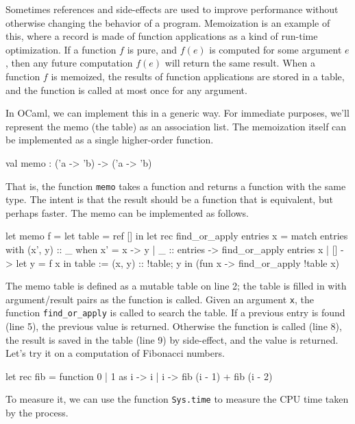 
Sometimes references and side-effects are used to improve performance without otherwise changing the
behavior of a program.  Memoization is an example of this, where a record is made of function
applications as a kind of run-time optimization.  If a function $f$ is pure, and $f(e)$ is computed
for some argument $e$, then any future computation $f(e)$ will return the same result.  When a
function $f$ is memoized, the results of function applications are stored in a table, and the
function is called at most once for any argument.

In OCaml, we can implement this in a generic way.  For immediate purposes, we'll represent the memo
(the table) as an association list.  The memoization itself can be implemented as a single higher-order function.

\begin{ocaml}
val memo : ('a -> 'b) -> ('a -> 'b)
\end{ocaml}
%
That is, the function \hbox{\lstinline/memo/} takes a function and returns a function with the same type.
The intent is that the result should be a function that is equivalent, but perhaps faster.  The memo
can be implemented as follows.

\begin{ocamlnum}
let memo f =
   let table = ref [] in
   let rec find_or_apply entries x =
      match entries with
         (x', y) :: _ when x' = x -> y
       | _ :: entries -> find_or_apply entries x
       | [] ->
          let y = f x in
          table := (x, y) :: !table;
          y
   in
   (fun x -> find_or_apply !table x)
\end{ocamlnum}
%
The memo table is defined as a mutable table on line 2; the table is filled in with argument/result
pairs as the function is called.  Given an argument \hbox{\lstinline/x/}, the
function \hbox{\lstinline/find_or_apply/} is called to search the table.  If a previous entry is found
(line 5), the previous value is returned.  Otherwise the function is called (line 8), the result is
saved in the table (line 9) by side-effect, and the value is returned.
Let's try it on a computation of Fibonacci numbers.

\begin{ocaml}
let rec fib = function
   0 | 1 as i -> i
 | i -> fib (i - 1) + fib (i - 2)
\end{ocaml}
%
To measure it, we can use the function \hbox{\lstinline/Sys.time/} to measure the CPU time taken by the process.

